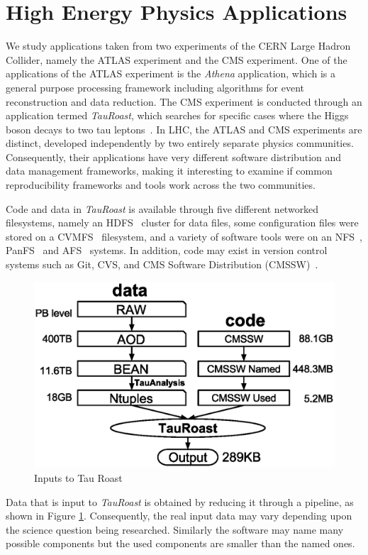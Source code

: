 


\section{High Energy Physics Applications}

We study applications taken from two experiments of the CERN Large Hadron Collider, namely the ATLAS experiment and the CMS experiment. 
One of the applications of the ATLAS experiment is the \emph{Athena} application, which is a general purpose processing framework including algorithms
for event reconstruction and data reduction. The CMS experiment is conducted through an application termed  \emph{TauRoast}, which searches for specific 
cases where the Higgs boson decays to two tau leptons~\cite{chatrchyan2013search}. In LHC, the ATLAS and CMS experiments are distinct, 
developed independently by two entirely separate physics communities. Consequently, their applications  
have very different software distribution and data management frameworks, making it interesting to examine if common reproducibility frameworks and 
tools work across the two communities. 



Code and data in \emph{TauRoast} is available through five different networked filesystems, namely an HDFS~\cite{borthakur2008hdfs} cluster for data files, 
some configuration files were stored on a CVMFS~\cite{blomer2011cernvm} filesystem, and a variety of software tools were on an NFS~\cite{sandberg1985design}, PanFS~\cite{welch2008scalable} and AFS~\cite{howard1988scale} systems.
In addition, code may exist in version control systems such as Git, CVS, and CMS Software Distribution (CMSSW)~\cite{cms2006cms}. 
\begin{figure}
\small
\centering
\includegraphics[width=.4\textwidth]{data-code-size.eps}
\caption{Inputs to Tau Roast}
\label{fig:data-code-size}
\end{figure}
Data that is input to \emph{TauRoast} is obtained by reducing it through a pipeline, as shown in Figure \ref{fig:data-code-size}. Consequently, the real input data may 
vary depending upon the science question being researched. Similarly the software may name many possible components but the used components are
smaller than the named ones. 

